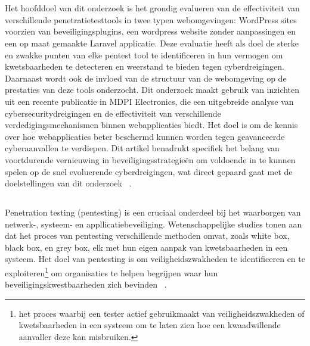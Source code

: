 \chapter{}%
\label{ch:stand-van-zaken}


\section{}

Het hoofddoel van dit onderzoek is het grondig evalueren van de effectiviteit van verschillende penetratietesttools in twee typen webomgevingen: 
WordPress sites voorzien van beveiligingsplugins, een wordpress website zonder aanpassingen en een op maat gemaakte Laravel applicatie. Deze evaluatie 
heeft als doel de sterke en zwakke punten van elke pentest tool te identificeren in hun vermogen om kwetsbaarheden te detecteren en weerstand te bieden 
tegen cyberdreigingen. Daarnaast wordt ook de invloed van de structuur van de webomgeving op de prestaties van deze tools onderzocht.
Dit onderzoek maakt gebruik van inzichten uit een recente publicatie in MDPI Electronics, die een uitgebreide analyse van cybersecuritydreigingen en 
de effectiviteit van verschillende verdedigingsmechanismen binnen webapplicaties biedt. Het doel is om de kennis over hoe webapplicaties beter 
beschermd kunnen worden tegen geavanceerde cyberaanvallen te verdiepen. Dit artikel benadrukt specifiek het belang van voortdurende vernieuwing 
in beveiligingsstrategieën om voldoende in te kunnen spelen op de snel evoluerende cyberdreigingen, wat direct gepaard gaat met de doelstellingen van dit 
onderzoek ~\autocite{Altulaihan2023}.

\section{}
\label{sec:pentesting}
Penetration testing (pentesting) is een cruciaal onderdeel bij het waarborgen van netwerk-, systeem- en appllicatiebeveiliging. 
Wetenschappelijke studies tonen aan dat het proces van pentesting verschillende methoden omvat, zoals white box, 
black box, en grey box, elk met hun eigen aanpak van kwetsbaarheden in een systeem. Het doel van pentesting is om 
veiligheidszwakheden te identificeren en te exploiteren\footnote{het proces waarbij een tester actief gebruikmaakt 
van veiligheidszwakheden of kwetsbaarheden in een systeem om te laten zien hoe een kwaadwillende aanvaller deze kan misbruiken.} 
om organisaties te helpen begrijpen waar hun beveiligingskwestbaarheden zich bevinden ~\autocite{Alhamed2023}.

